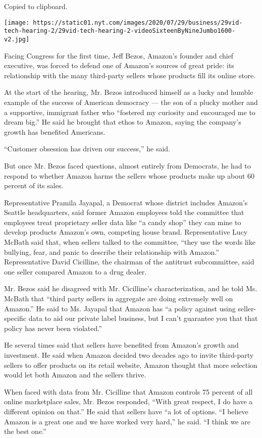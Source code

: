 Copied to clipboard.

\texttt{[image: https://static01.nyt.com/images/2020/07/29/business/29vid-tech-hearing-2/29vid-tech-hearing-2-videoSixteenByNineJumbo1600-v2.jpg]}

Facing Congress for the first time, Jeff Bezos, Amazon's founder and
chief executive, was forced to defend one of Amazon's sources of great
pride: its relationship with the many third-party sellers whose products
fill its online store.

At the start of the hearing, Mr. Bezos introduced himself as a lucky and
humble example of the success of American democracy --- the son of a
plucky mother and a supportive, immigrant father who ``fostered my
curiosity and encouraged me to dream big.'' He said he brought that
ethos to Amazon, saying the company's growth has benefited Americans.

``Customer obsession has driven our success,'' he said.

But once Mr. Bezos faced questions, almost entirely from Democrats, he
had to respond to whether Amazon harms the sellers whose products make
up about 60 percent of its sales.

Representative Pramila Jayapal, a Democrat whose district includes
Amazon's Seattle headquarters, said former Amazon employees told the
committee that employees treat proprietary seller data like ``a candy
shop'' they can mine to develop products Amazon's own, competing house
brand. Representative Lucy McBath said that, when sellers talked to the
committee, ``they use the words like bullying, fear, and panic to
describe their relationship with Amazon.'' Representative David
Cicilline, the chairman of the antitrust subcommittee, said one seller
compared Amazon to a drug dealer.

Mr. Bezos said he disagreed with Mr. Cicilline's characterization, and
he told Ms. McBath that ``third party sellers in aggregate are doing
extremely well on Amazon.'' He said to Ms. Jayapal that Amazon has ``a
policy against using seller-specific data to aid our private label
business, but I can't guarantee you that that policy has never been
violated.''

He several times said that sellers have benefited from Amazon's growth
and investment. He said when Amazon decided two decades ago to invite
third-party sellers to offer products on its retail website, Amazon
thought that more selection would let both Amazon and the sellers
thrive.

When faced with data from Mr. Cicilline that Amazon controls 75 percent
of all online marketplace sales, Mr. Bezos responded, ``With great
respect, I do have a different opinion on that.'' He said that sellers
have ``a lot of options. ``I believe Amazon is a great one and we have
worked very hard,'' he said. ``I think we are the best one.''

